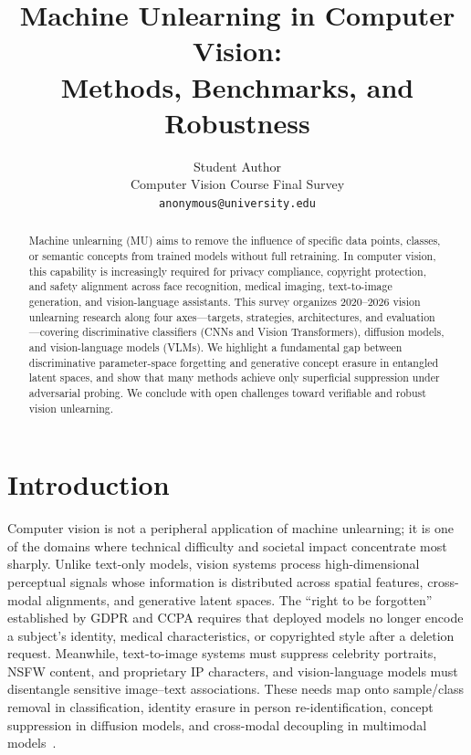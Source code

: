 \documentclass[10pt,twocolumn,letterpaper]{article}
\title{Machine Unlearning in Computer Vision:\\ Methods, Benchmarks, and Robustness}
\author{
Student Author\\
Computer Vision Course Final Survey\\
{\tt\small anonymous@university.edu}
}
\begin{document}
\maketitle

\begin{abstract}
Machine unlearning (MU) aims to remove the influence of specific data points, classes, or semantic concepts from trained models without full retraining. In computer vision, this capability is increasingly required for privacy compliance, copyright protection, and safety alignment across face recognition, medical imaging, text-to-image generation, and vision-language assistants. This survey organizes 2020--2026 vision unlearning research along four axes---targets, strategies, architectures, and evaluation---covering discriminative classifiers (CNNs and Vision Transformers), diffusion models, and vision-language models (VLMs). We highlight a fundamental gap between discriminative parameter-space forgetting and generative concept erasure in entangled latent spaces, and show that many methods achieve only superficial suppression under adversarial probing. We conclude with open challenges toward verifiable and robust vision unlearning.
\end{abstract}

\section{Introduction}

Computer vision is not a peripheral application of machine unlearning; it is one of the domains where technical difficulty and societal impact concentrate most sharply. Unlike text-only models, vision systems process high-dimensional perceptual signals whose information is distributed across spatial features, cross-modal alignments, and generative latent spaces. The ``right to be forgotten'' established by GDPR and CCPA requires that deployed models no longer encode a subject's identity, medical characteristics, or copyrighted style after a deletion request. Meanwhile, text-to-image systems must suppress celebrity portraits, NSFW content, and proprietary IP characters, and vision-language models must disentangle sensitive image--text associations. These needs map onto sample/class removal in classification, identity erasure in person re-identification, concept suppression in diffusion models, and cross-modal decoupling in multimodal models~\cite{bourtoule2021,safavigerdini2026}.
\end{document}
